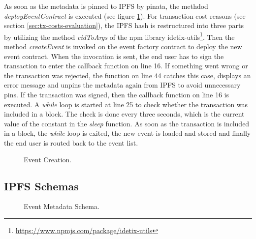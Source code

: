 As soon as the metadata is pinned to IPFS by pinata, the methdod \textit{deployEventContract} is executed (see figure \ref{code:create-event}). For transaction cost reasons (see section \ref{sec:tx-costs-evaluation}), the IPFS hash is restructured into three parts by utilizing the method \textit{cidToArgs} of the npm library idetix-utils\footnote{\url{https://www.npmjs.com/package/idetix-utils}}. Then the method \textit{createEvent} is invoked on the event factory contract to deploy the new event contract. When the invocation is sent, the end user has to sign the transaction to enter the callback function on line 16. If something went wrong or the transaction was rejected, the function on line 44 catches this case, displays an error message and unpins the metadata again from IPFS to avoid unnecessary pins. If the transaction was signed, then the callback function on line 16 is executed. A \textit{while} loop is started at line 25 to check whether the transaction was included in a block. The check is done every three seconds, which is the current value of the constant in the \textit{sleep} function. As soon as the transaction is included in a block, the \textit{while} loop is exited, the new event is loaded and stored and finally the end user is routed back to the event list.

\begin{figure}[H]
    
    \caption{Event Creation.}
    \label{code:create-event}
\end{figure}

\subsection{IPFS Schemas}

\begin{figure}[H]
    
    \caption{Event Metadata Schema.}
    \label{code:event-metadata-schema}
\end{figure}
